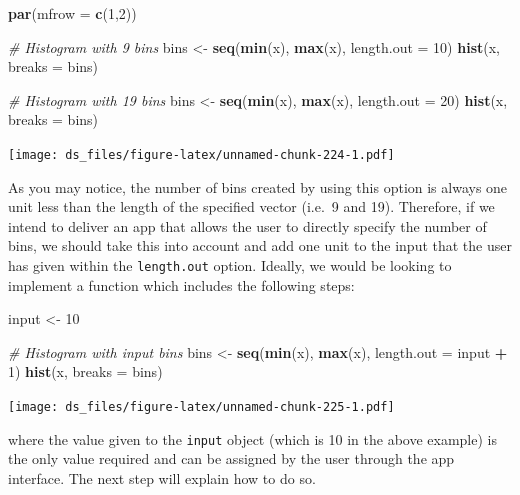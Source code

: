 \documentclass[12pt,]{krantz}
\newenvironment{Shaded}{\begin{snugshade}}{\end{snugshade}}
\newcommand{\KeywordTok}[1]{\textcolor[rgb]{0.27,0.27,0.27}{\textbf{#1}}}
\newcommand{\DataTypeTok}[1]{\textcolor[rgb]{0.27,0.27,0.27}{#1}}
\newcommand{\DecValTok}[1]{\textcolor[rgb]{0.06,0.06,0.06}{#1}}
\newcommand{\StringTok}[1]{\textcolor[rgb]{0.5,0.5,0.5}{#1}}
\newcommand{\CommentTok}[1]{\textcolor[rgb]{0.37,0.37,0.37}{\textit{#1}}}
\newcommand{\OperatorTok}[1]{\textcolor[rgb]{0.43,0.43,0.43}{\textbf{#1}}}
\newcommand{\NormalTok}[1]{#1}
\begin{document}
\begin{Shaded}
\begin{Highlighting}[]
\KeywordTok{par}\NormalTok{(}\DataTypeTok{mfrow =} \KeywordTok{c}\NormalTok{(}\DecValTok{1}\NormalTok{,}\DecValTok{2}\NormalTok{))}

\CommentTok{# Histogram with 9 bins}
\NormalTok{bins <-}\StringTok{ }\KeywordTok{seq}\NormalTok{(}\KeywordTok{min}\NormalTok{(x), }\KeywordTok{max}\NormalTok{(x), }\DataTypeTok{length.out =} \DecValTok{10}\NormalTok{)}
\KeywordTok{hist}\NormalTok{(x, }\DataTypeTok{breaks =}\NormalTok{ bins)}

\CommentTok{# Histogram with 19 bins}
\NormalTok{bins <-}\StringTok{ }\KeywordTok{seq}\NormalTok{(}\KeywordTok{min}\NormalTok{(x), }\KeywordTok{max}\NormalTok{(x), }\DataTypeTok{length.out =} \DecValTok{20}\NormalTok{)}
\KeywordTok{hist}\NormalTok{(x, }\DataTypeTok{breaks =}\NormalTok{ bins)}
\end{Highlighting}
\end{Shaded}

\texttt{[image: ds\_files/figure-latex/unnamed-chunk-224-1.pdf]}

As you may notice, the number of bins created by using this option is
always one unit less than the length of the specified vector (i.e.~9 and
19). Therefore, if we intend to deliver an app that allows the user to
directly specify the number of bins, we should take this into account
and add one unit to the input that the user has given within the
\texttt{length.out} option. Ideally, we would be looking to implement a
function which includes the following steps:

\begin{Shaded}
\begin{Highlighting}[]
\NormalTok{input <-}\StringTok{ }\DecValTok{10}

\CommentTok{# Histogram with input bins}
\NormalTok{bins <-}\StringTok{ }\KeywordTok{seq}\NormalTok{(}\KeywordTok{min}\NormalTok{(x), }\KeywordTok{max}\NormalTok{(x), }\DataTypeTok{length.out =}\NormalTok{ input }\OperatorTok{+}\StringTok{ }\DecValTok{1}\NormalTok{)}
\KeywordTok{hist}\NormalTok{(x, }\DataTypeTok{breaks =}\NormalTok{ bins)}
\end{Highlighting}
\end{Shaded}

\texttt{[image: ds\_files/figure-latex/unnamed-chunk-225-1.pdf]}

where the value given to the \texttt{input} object (which is 10 in the
above example) is the only value required and can be assigned by the
user through the app interface. The next step will explain how to do so.
\end{document}
